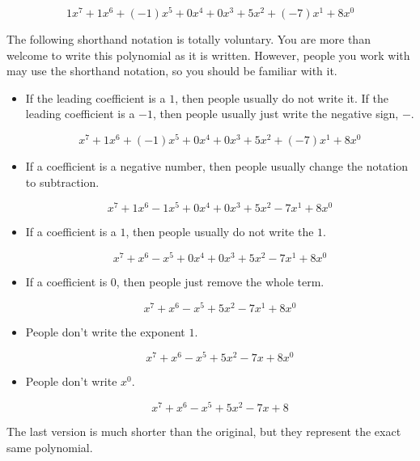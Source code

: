 \documentclass{ximera}
\begin{document}
\[  1 x^7 + 1 x^6 + (-1) x^5 + 0 x^4 + 0 x^3 + 5 x^2 + (-7) x^1 + 8 x^0              \]



The following shorthand notation is totally voluntary.  You are more than welcome to write this polynomial as it is written. However, people you work with may use the shorthand notation, so you should be familiar with it.



\begin{itemize}
\item If the leading coefficient is a $1$, then people usually do not write it. If the leading coefficient is a $-1$, then people usually just write the negative sign, $-$.


\[  x^7 + 1 x^6 + (-1) x^5 + 0 x^4 + 0 x^3 + 5 x^2 + (-7) x^1 + 8 x^0              \]


\item If a coefficient is a negative number, then people usually change the notation to subtraction.


\[  x^7 + 1 x^6 - 1 x^5 + 0 x^4 + 0 x^3 + 5 x^2 - 7 x^1 + 8 x^0              \]



\item If a coefficient is a $1$, then people usually do not write the $1$.


\[  x^7 + x^6 - x^5 + 0 x^4 + 0 x^3 + 5 x^2 - 7 x^1 + 8 x^0              \]


\item If a coefficient is $0$, then people just remove the whole term.

\[  x^7 + x^6 - x^5 + 5 x^2 - 7 x^1 + 8 x^0              \]


\item People don't write the exponent $1$.

\[  x^7 + x^6 - x^5 + 5 x^2 - 7 x + 8 x^0              \]



\item People don't write $x^0$.

\[  x^7 + x^6 - x^5 + 5 x^2 - 7 x + 8             \]




\end{itemize}




The last version is much shorter than the original, but they represent the exact same polynomial.
\end{document}
